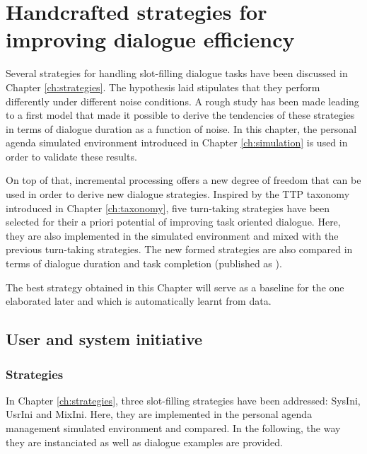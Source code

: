 \chapter{Handcrafted strategies for improving dialogue efficiency}
\label{ch:baseline}

	Several strategies for handling slot-filling dialogue tasks have been discussed in Chapter \ref{ch:strategies}. The hypothesis laid stipulates that they perform differently under different noise conditions. A rough study has been made leading to a first model that made it possible to derive the tendencies of these strategies in terms of dialogue duration as a function of noise. In this chapter, the personal agenda simulated environment introduced in Chapter \ref{ch:simulation} is used in order to validate these results.
	
	On top of that, incremental processing offers a new degree of freedom that can be used in order to derive new dialogue strategies. Inspired by the TTP taxonomy introduced in Chapter \ref{ch:taxonomy}, five turn-taking strategies have been selected for their a priori potential of improving task oriented dialogue. Here, they are also implemented in the simulated environment and mixed with the previous turn-taking strategies. The new formed strategies are also compared in terms of dialogue duration and task completion (published as \cite{Khouzaimi2015a}).
	
	The best strategy obtained in this Chapter will serve as a baseline for the one elaborated later and which is automatically learnt from data.

\section{User and system initiative}
	\subsection{Strategies}
  \label{subsec:strategies}
				
				In Chapter \ref{ch:strategies}, three slot-filling strategies have been addressed: SysIni, UsrIni and MixIni. Here, they are implemented in the personal agenda management simulated environment and compared. In the following, the way they are instanciated as well as dialogue examples are provided.

